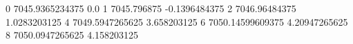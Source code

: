 0 7045.9365234375 0.0
1 7045.796875 -0.1396484375
2 7046.96484375 1.0283203125
4 7049.5947265625 3.658203125
6 7050.14599609375 4.20947265625
8 7050.0947265625 4.158203125

